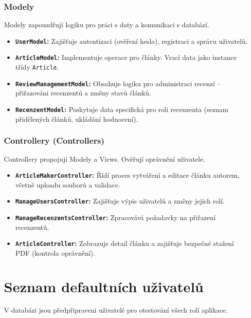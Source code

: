 \documentclass[12pt,a4paper]{article}
\begin{document}
\subsubsection{Modely}
Modely zapouzdřují logiku pro práci s daty a komunikaci s databází.
\begin{itemize}
    \item \textbf{\texttt{UserModel}:} Zajišťuje autentizaci (ověření hesla), registraci a správu uživatelů.
    \item \textbf{\texttt{ArticleModel}:} Implementuje operace pro články. Vrací data jako instance třídy \texttt{Article}.
    \item \textbf{\texttt{ReviewManagementModel}:} Obsahuje logiku pro administraci recenzí – přiřazování recenzentů a změny stavů článků.
    \item \textbf{\texttt{RecenzentModel}:} Poskytuje data specifická pro roli recenzenta (seznam přidělených článků, ukládání hodnocení).
\end{itemize}

\subsubsection{Controllery (Controllers)}
Controllery propojují Modely a Views. Ověřují oprávnění uživatele.
\begin{itemize}
    \item \textbf{\texttt{ArticleMakerController}:} Řídí proces vytváření a editace článku autorem, včetně uploadu souborů a validace.
    \item \textbf{\texttt{ManageUsersController}:} Zajišťuje výpis uživatelů a změny jejich rolí.
    \item \textbf{\texttt{ManageRecenzentsController}:} Zpracovává požadavky na přiřazení recenzentů.
    \item \textbf{\texttt{ArticleController}:} Zobrazuje detail článku a zajišťuje bezpečné stažení PDF (kontrola oprávnění).
\end{itemize}

\section{Seznam defaultních uživatelů}

V databázi jsou předpřipraveni uživatelé pro otestování všech rolí aplikace.
\end{document}
